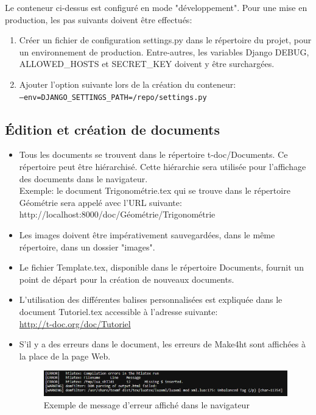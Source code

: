 \documentclass[12pt,titlepage,oneside]{article}
\begin{document}
\newpage
Le conteneur ci-dessus est configuré en mode "développement". Pour une mise en production, les pas suivants doivent être effectués:
\begin{enumerate}
  \item Créer un fichier de configuration settings.py dans le répertoire du projet, pour un environnement de production. Entre-autres, les variables Django DEBUG, ALLOWED\_HOSTS et SECRET\_KEY doivent y être surchargées.
  \item Ajouter l'option suivante lors de la création du conteneur:\\
  \texttt{--env=DJANGO\_SETTINGS\_PATH=/repo/settings.py}
\end{enumerate}

\subsection{Édition et création de documents}
\begin{itemize}
\item Tous les documents se trouvent dans le répertoire t-doc/Documents. Ce répertoire peut être hiérarchisé. Cette hiérarchie sera utilisée pour l'affichage des documents dans le navigateur.\\
Exemple: le document Trigonométrie.tex qui se trouve dans le répertoire Géométrie sera appelé avec l'URL suivante:\\
http://localhost:8000/doc/Géométrie/Trigonométrie\par

\item Les images doivent être impérativement sauvegardées, dans le même répertoire, dans un dossier "images".\par

\item Le fichier Template.tex, disponible dans le répertoire Documents, fournit un point de départ pour la création de nouveaux documents.\par

\item L'utilisation des différentes balises personnalisées est expliquée dans le document Tutoriel.tex accessible à l'adresse suivante:\\
\url{http://t-doc.org/doc/Tutoriel}\par

\item S'il y a des erreurs dans le document, les erreurs de Make4ht sont affichées à la place de la page Web.
\begin{figure}[H]
\centering
\includegraphics[width=1\textwidth]{images/Erreur.png}\caption{Exemple de message d'erreur affiché dans le navigateur}
\end{figure}
\end{itemize}
\end{document}
